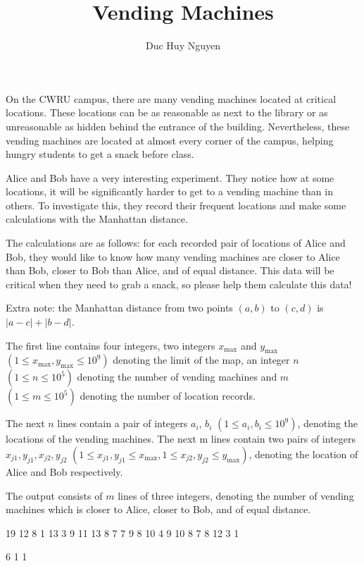\documentclass{article}
\title{Vending Machines}
\author{Duc Huy Nguyen}
\begin{document}
\begin{problemDescription}
    On the CWRU campus, there are many vending machines located at critical locations. These locations can be as reasonable as next to the library or as unreasonable as hidden behind the entrance of the building. Nevertheless, these vending machines are located at almost every corner of the campus, helping hungry students to get a snack before class.

Alice and Bob have a very interesting experiment. They notice how at some locations, it will be significantly harder to get to a vending machine than in others. To investigate this, they record their frequent locations and make some calculations with the Manhattan distance.

The calculations are as follows: for each recorded pair of locations of Alice and Bob, they would like to know how many vending machines are closer to Alice than Bob, closer to Bob than Alice, and of equal distance. This data will be critical when they need to grab a snack, so please help them calculate this data!

Extra note: the Manhattan distance from two points $(a, b)$ to $(c, d)$ is $ \lvert a - c \rvert + \lvert b - d\rvert$.


\end{problemDescription}

\begin{inputDescription}

    The first line contains four integers, two integers $x_{\max}$ and $y_{\max}$ $(1 \leq x_{\max}, y_{\max} \leq 10^9)$ denoting the limit of the map, an integer $n$ $(1 \leq n \leq 10^5)$ denoting the number of vending machines and $m$ $(1 \leq m \leq 10^5)$ denoting the number of location records.

    The next $n$ lines contain a pair of integers $a_i$, $b_i$ $(1 \leq a_i, b_i \leq 10^9)$, denoting the locations of the vending machines.
    The next m lines contain two pairs of integers $x_{j1}, y_{j1}, x_{j2}, y_{j2}$ $(1 \leq x_{j1}, y_{j1} \leq x_{\max}, 1 \leq x_{j2}, y_{j2} \leq y_{\max})$, denoting the location of Alice and Bob respectively.
    

\end{inputDescription}

\begin{outputDescription}
The output consists of $m$ lines of three integers, denoting the number of vending machines which is closer to Alice, closer to Bob, and of equal distance.
\end{outputDescription}

\begin{sampleInput}
19 12 8 1
13 3
9 11
13 8
7 7
9 8
10 4
9 10
8 7
8 12 3 1
\end{sampleInput}
\begin{sampleOutput}
6 1 1
\end{sampleOutput}
\end{document}

